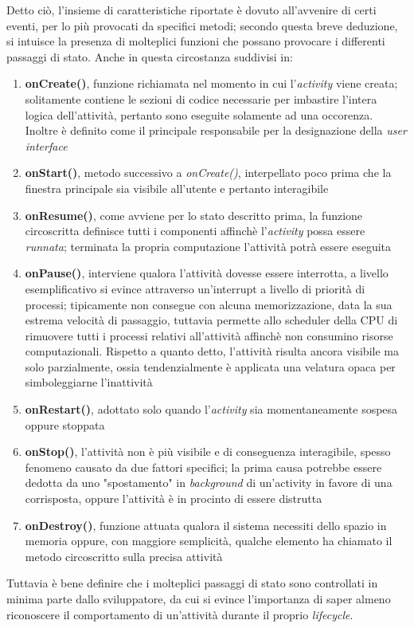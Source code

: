 \documentclass{article}
\begin{document}
Detto ciò, l'insieme di caratteristiche riportate è dovuto all'avvenire di certi eventi, per lo più provocati da specifici metodi; secondo questa breve deduzione, si intuisce la presenza di molteplici funzioni che possano provocare i differenti passaggi di stato. Anche in questa circostanza suddivisi in:
\begin{enumerate}
  \itemsep0em 
  \renewcommand{\labelenumi}{-}
  \item \textbf{onCreate()}, funzione richiamata nel momento in cui l'\textit{activity} viene creata; solitamente contiene le sezioni di codice necessarie per imbastire l'intera logica dell'attività, pertanto sono eseguite solamente ad una occorenza. Inoltre è definito come il principale responsabile per la designazione della \textit{user interface}
  \item \textbf{onStart()}, metodo successivo a \textit{onCreate()}, interpellato poco prima che la finestra principale sia visibile all'utente e pertanto interagibile
  \item \textbf{onResume()}, come avviene per lo stato descritto prima, la funzione circoscritta definisce tutti i componenti affinchè l'\textit{activity} possa essere \textit{runnata}; terminata la propria computazione l'attività potrà essere eseguita
  \item \textbf{onPause()}, interviene qualora l'attività dovesse essere interrotta, a livello esemplificativo si evince attraverso un'interrupt a livello di priorità di processi; tipicamente non consegue con alcuna memorizzazione, data la sua estrema velocità di passaggio, tuttavia permette allo scheduler della CPU di rimuovere tutti i processi relativi all'attività affinchè non consumino risorse computazionali. Rispetto a quanto detto, l'attività risulta ancora visibile ma solo parzialmente, ossia tendenzialmente è applicata una velatura opaca per simboleggiarne l'inattività
  \item \textbf{onRestart()}, adottato solo quando l'\textit{activity} sia momentaneamente sospesa oppure stoppata
  \item \textbf{onStop()}, l'attività non è più visibile e di conseguenza interagibile, spesso fenomeno causato da due fattori specifici; la prima causa potrebbe essere dedotta da uno "spostamento" in \textit{background} di un'activity in favore di una corrisposta, oppure l'attività è in procinto di essere distrutta
  \item \textbf{onDestroy()}, funzione attuata qualora il sistema necessiti dello spazio in memoria oppure, con maggiore semplicità, qualche elemento ha chiamato il metodo circoscritto sulla precisa attività
\end{enumerate}   
Tuttavia è bene definire che i molteplici passaggi di stato sono controllati in minima parte dallo sviluppatore, da cui si evince l'importanza di saper almeno riconoscere il comportamento di un'attività durante il proprio \textit{lifecycle}.
\end{document}

